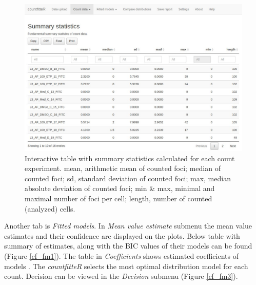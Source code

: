 \begin{figure}[htbp]
  \centering
  \includegraphics[width=0.99\columnwidth]{fig/cf_cd2.pdf}
  \caption{Interactive table with summary statistics calculated for each count experiment. mean, arithmetic mean of counted foci; median of counted foci; sd, standard deviation of counted foci; max, median absolute deviation of counted foci; min \& max, minimal and maximal number of foci per cell; length, number of counted (analyzed) cells.}
    \label{cf_cd2}
\end{figure}


Another tab is \textit{Fitted models}. In \textit{Mean value estimate} submenu the mean value estimates and their confidence are displayed on the plots. Below table with summary of estimates, along with the BIC values of their models can be found (Figure \ref{cf_fm1}). The table in \textit{Coefficients} shows estimated coefficients of models
. The \emph{countfitteR} selects the most optimal distribution model for each count. Decision can be viewed in the \textit{Decision} submenu (Figure \ref{cf_fm3}).


